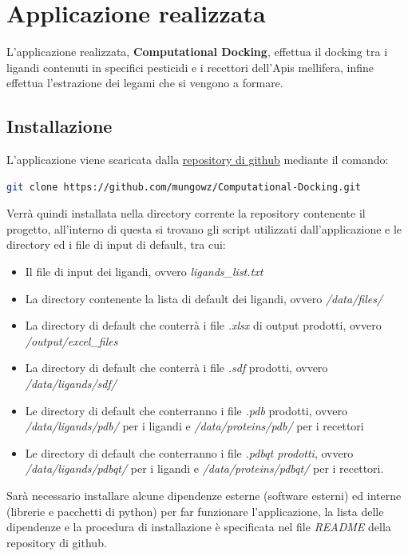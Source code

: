 \chapter{Applicazione realizzata}
L'applicazione realizzata, \textbf{Computational Docking}, effettua il docking tra i ligandi contenuti in specifici pesticidi e i recettori dell'Apis mellifera, infine effettua l'estrazione dei legami che si vengono a formare. 

\section{Installazione}
L'applicazione viene scaricata dalla \href{https://github.com/mungowz/Computational-Docking.git}{repository di github} mediante il comando:

\begin{lstlisting}[language=Bash, label=lst:code1, caption={Comando per scaricare la repository}]
git clone https://github.com/mungowz/Computational-Docking.git
\end{lstlisting}

Verrà quindi installata nella directory corrente la repository contenente il progetto, all'interno di questa si trovano gli script utilizzati dall'applicazione e le directory ed i file di input di default, tra cui:

\begin{itemize}
    \item Il file di input dei ligandi, ovvero \textit{ligands\_list.txt}
    \item La directory contenente la lista di default dei ligandi, ovvero \textit{/data/files/}
    \item La directory di default che conterrà i file \textit{.xlsx} di output prodotti, ovvero \textit{/output/excel\_files}
    \item La directory di default che conterrà i file \textit{.sdf} prodotti, ovvero \textit{/data/ligands/sdf/}
    \item Le directory di default che conterranno i file \textit{.pdb} prodotti, ovvero \textit{/data/ligands/pdb/} per i ligandi e \textit{/data/proteins/pdb/} per i recettori
    \item Le directory di default che conterranno i file \textit{.pdbqt prodotti}, ovvero \textit{/data/ligands/pdbqt/} per i ligandi e \textit{/data/proteins/pdbqt/} per i recettori.
\end{itemize}

Sarà necessario installare alcune dipendenze esterne (software esterni) ed interne (librerie e pacchetti di python) per far funzionare l'applicazione, la lista delle dipendenze e la procedura di installazione è specificata nel file \textit{README} della repository di github.

